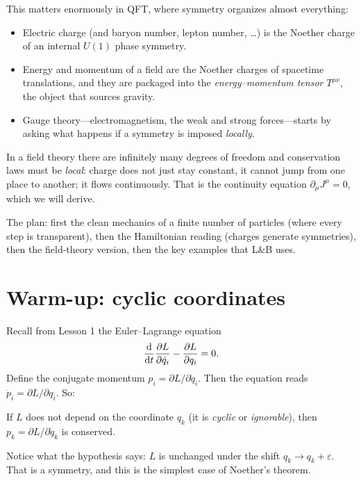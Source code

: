 \documentclass[11pt]{article}
\newcommand{\eps}{\varepsilon}
\begin{document}
This matters enormously in QFT, where symmetry organizes almost everything:
\begin{itemize}
  \item Electric charge (and baryon number, lepton number, \dots) is the Noether charge of an internal $U(1)$ phase symmetry.
  \item Energy and momentum of a field are the Noether charges of spacetime translations, and they are packaged into the \emph{energy--momentum tensor} $T^{\mu\nu}$, the object that sources gravity.
  \item Gauge theory---electromagnetism, the weak and strong forces---starts by asking what happens if a symmetry is imposed \emph{locally}.
\end{itemize}
In a field theory there are infinitely many degrees of freedom and conservation laws must be \emph{local}: charge does not just stay constant, it cannot jump from one place to another; it flows continuously. That is the continuity equation $\partial_\mu J^\mu=0$, which we will derive.

The plan: first the clean mechanics of a finite number of particles (where every step is transparent), then the Hamiltonian reading (charges generate symmetries), then the field-theory version, then the key examples that L\&B uses.

\section{Warm-up: cyclic coordinates}

Recall from Lesson 1 the Euler--Lagrange equation
\begin{equation}
  \frac{\mathrm{d} }{\mathrm{d} t}\frac{\partial L}{\partial \dot q_i}-\frac{\partial L}{\partial q_i}=0 .
\end{equation}
Define the conjugate momentum $p_i=\partial L/\partial\dot q_i$. Then the equation reads $\dot p_i=\partial L/\partial q_i$. So:

\begin{keyresult}
If $L$ does not depend on the coordinate $q_k$ (it is \emph{cyclic} or \emph{ignorable}), then $p_k=\partial L/\partial\dot q_k$ is conserved.
\end{keyresult}

Notice what the hypothesis says: $L$ is unchanged under the shift $q_k\to q_k+\eps$. That is a symmetry, and this is the simplest case of Noether's theorem.
\end{document}
